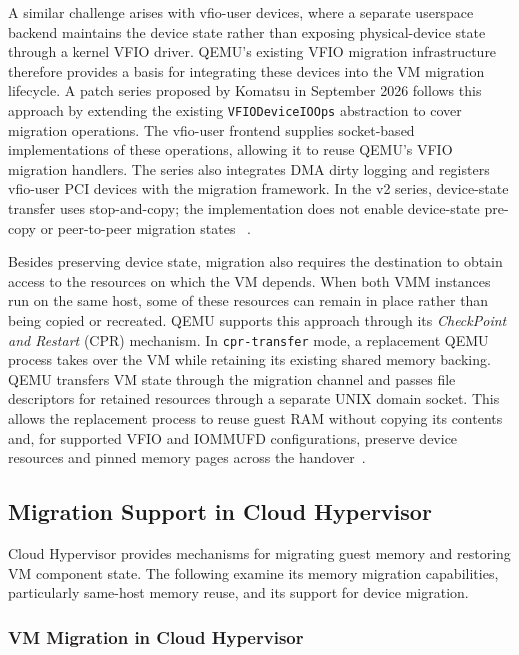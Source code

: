 A similar challenge arises with vfio-user devices, where a separate
userspace backend maintains the device state rather than exposing
physical-device state through a kernel VFIO driver. QEMU's existing VFIO
migration infrastructure therefore provides a basis for integrating these
devices into the VM migration lifecycle. A patch series proposed by
Komatsu in September 2026 follows this approach by extending the existing
\texttt{VFIODeviceIOOps} abstraction to cover migration operations.
The vfio-user frontend supplies socket-based implementations of these
operations, allowing it to reuse QEMU's VFIO migration handlers.
The series also integrates DMA dirty logging and registers vfio-user
PCI devices with the migration framework. In the v2 series, device-state
transfer uses stop-and-copy; the implementation does not enable
device-state pre-copy or peer-to-peer migration states
~\cite{komatsu2026vfio-user-migration}.

Besides preserving device state, migration also requires the destination 
to obtain access to the resources on which the VM depends. When both VMM 
instances run on the same host, some of these resources can remain in 
place rather than being copied or recreated. QEMU supports this approach 
through its \emph{CheckPoint and Restart} (CPR) mechanism. In 
\texttt{cpr-transfer} mode, a replacement QEMU process takes over the VM 
while retaining its existing shared memory backing. QEMU transfers VM 
state through the migration channel and passes file descriptors for 
retained resources through a separate UNIX domain socket. This allows 
the replacement process to reuse guest RAM without copying its contents 
and, for supported VFIO and IOMMUFD configurations, preserve device 
resources and pinned memory pages across the handover~\cite{qemu-cpr}.

\subsection{Migration Support in Cloud Hypervisor}
\label{sec:state:cloud-hypervisor-migration}

Cloud Hypervisor provides mechanisms for migrating guest memory and restoring 
VM component state. The following examine its memory migration capabilities, 
particularly same-host memory reuse, and its support for device migration.

\subsubsection{VM Migration in Cloud Hypervisor}
\label{sec:state:cloud-hypervisor-vm-migration}

